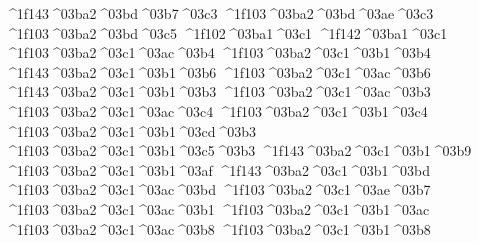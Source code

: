 {	^^^^1f143^^^^03ba2^^^^03bd^^^^03b7^^^^03c3		%
	^^^^1f103^^^^03ba2^^^^03bd^^^^03ae^^^^03c3		%
	^^^^1f103^^^^03ba2^^^^03bd^^^^03c5    		%
^^^^1f102^^^^03ba1^^^^03c1
^^^^1f142^^^^03ba1^^^^03c1
	^^^^1f103^^^^03ba2^^^^03c1^^^^03ac^^^^03b4		%
	^^^^1f103^^^^03ba2^^^^03c1^^^^03b1^^^^03b4
	^^^^1f143^^^^03ba2^^^^03c1^^^^03b1^^^^03b6		%
	^^^^1f103^^^^03ba2^^^^03c1^^^^03ac^^^^03b6
	^^^^1f143^^^^03ba2^^^^03c1^^^^03b1^^^^03b3		%
	^^^^1f103^^^^03ba2^^^^03c1^^^^03ac^^^^03b3
	^^^^1f103^^^^03ba2^^^^03c1^^^^03ac^^^^03c4		%
	^^^^1f103^^^^03ba2^^^^03c1^^^^03b1^^^^03c4
	^^^^1f103^^^^03ba2^^^^03c1^^^^03b1^^^^03cd^^^^03b3		%
	^^^^1f103^^^^03ba2^^^^03c1^^^^03b1^^^^03c5^^^^03b3
	^^^^1f143^^^^03ba2^^^^03c1^^^^03b1^^^^03b9		%
	^^^^1f103^^^^03ba2^^^^03c1^^^^03b1^^^^03af
	^^^^1f143^^^^03ba2^^^^03c1^^^^03b1^^^^03bd		%
	^^^^1f103^^^^03ba2^^^^03c1^^^^03ac^^^^03bd
	^^^^1f103^^^^03ba2^^^^03c1^^^^03ae^^^^03b7		%
	^^^^1f103^^^^03ba2^^^^03c1^^^^03ac^^^^03b1
	^^^^1f103^^^^03ba2^^^^03c1^^^^03b1^^^^03ac
	^^^^1f103^^^^03ba2^^^^03c1^^^^03ac^^^^03b8  		%
	^^^^1f103^^^^03ba2^^^^03c1^^^^03b1^^^^03b8
}

